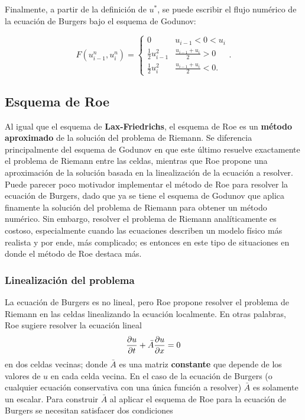 \documentclass[12pt]{article}
\begin{document}
 	 Finalmente, a partir de la definición de $u^{*}$, se puede escribir el flujo numérico de la ecuación de Burgers bajo el esquema de Godunov:
  	
  	\begin{equation}
  		\boxed{F(u_{i-1}^{n}, u_{i}^{n}) =
  		\begin{cases}
  			0 & u_{i-1} < 0 < u_{i}\\
  			\frac{1}{2}u_{i-1}^{2} & \frac{u_{i-1} + u_{i}}{2} > 0 \\
  			\frac{1}{2}u_{i}^{2} & \frac{u_{i-1} + u_{i}}{2} < 0.
  		\end{cases}.}
  		\label{eq:flujo-godunov}
  	\end{equation}
 	 
 	 \subsection{Esquema de Roe}
 	Al igual que el esquema de \textbf{Lax-Friedrichs}, el esquema de Roe es un \textbf{método aproximado} de la solución del problema de Riemann. Se diferencia principalmente del esquema de Godunov en que este último resuelve exactamente el problema de Riemann entre las celdas, mientras que Roe propone una aproximación de la solución basada en la linealización de la ecuación a resolver. Puede parecer poco motivador implementar el método de Roe para resolver la ecuación de Burgers, dado que ya se tiene el esquema de Godunov que aplica finamente la solución del problema de Riemann para obtener un método numérico. Sin embargo, resolver el problema de Riemann analíticamente es costoso, especialmente cuando las ecuaciones describen un modelo físico más realista y por ende, más complicado; es entonces en este tipo de situaciones en donde el método de Roe destaca más.
	
	\subsubsection{Linealización del problema}
	La ecuación de Burgers es no lineal, pero Roe propone resolver el problema de Riemann en las celdas linealizando la ecuación localmente. En otras palabras, Roe sugiere resolver la ecuación lineal
	\begin{equation}
		\pdv{u}{t} + \bar{A} \pdv{u}{x} = 0
		\label{eq:roelineal}
	\end{equation}
	en dos celdas vecinas; donde $\bar{A}$ es una matriz \textbf{constante} que depende de los valores de $u$ en cada celda vecina. En el caso de la ecuación de Burgers (o cualquier ecuación conservativa con una única función a resolver) $\bar{A}$ es solamente un escalar. Para construir $\bar{A}$ al aplicar el esquema de Roe para la ecuación de Burgers se necesitan satisfacer dos condiciones
	
\end{document}
